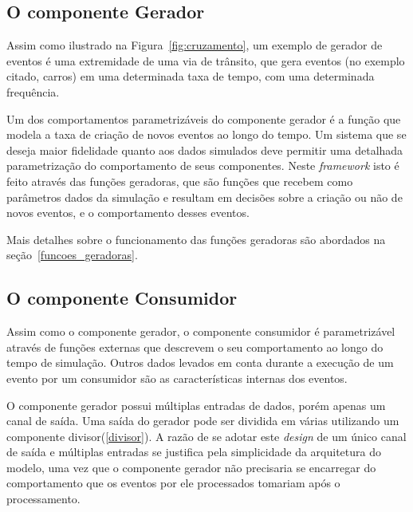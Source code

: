 \subsection{O componente Gerador}

Assim como ilustrado na Figura~\ref{fig:cruzamento}, um exemplo de gerador de eventos é uma extremidade de uma via de trânsito, que gera eventos (no exemplo citado, carros) em uma determinada taxa de tempo, com uma determinada frequência.

Um dos comportamentos parametrizáveis do componente gerador é a função que modela a taxa de criação de novos eventos ao longo do tempo. Um sistema que se deseja maior fidelidade quanto aos dados simulados deve permitir uma detalhada parametrização do comportamento de seus componentes. Neste \textit{framework} isto é feito através das funções geradoras, que são funções que recebem como parâmetros dados da simulação e resultam em decisões sobre a criação ou não de novos eventos, e o comportamento desses eventos.

Mais detalhes sobre o funcionamento das funções geradoras são abordados na seção~\ref{funcoes_geradoras}.

\subsection{O componente Consumidor}

Assim como o componente gerador, o componente consumidor é parametrizável através de funções externas que descrevem o seu comportamento ao longo do tempo de simulação. Outros dados levados em conta durante a execução de um evento por um consumidor são as características internas dos eventos.

O componente gerador possui múltiplas entradas de dados, porém apenas um canal de saída. Uma saída do gerador pode ser dividida em várias utilizando um componente divisor(\ref{divisor}). A razão de se adotar este \textit{design} de um único canal de saída e múltiplas entradas se justifica pela simplicidade da arquitetura do modelo, uma vez que o componente gerador não precisaria se encarregar do comportamento que os eventos por ele processados tomariam após o processamento.

